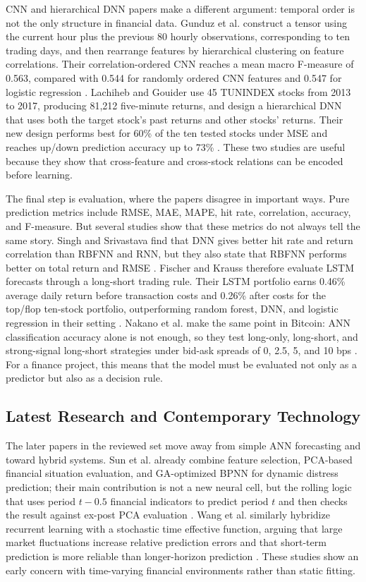 \documentclass[conference]{IEEEtran}
\begin{document}
CNN and hierarchical DNN papers make a different argument: temporal order is not the only structure in financial data. Gunduz et al. construct a tensor using the current hour plus the previous 80 hourly observations, corresponding to ten trading days, and then rearrange features by hierarchical clustering on feature correlations. Their correlation-ordered CNN reaches a mean macro F-measure of 0.563, compared with 0.544 for randomly ordered CNN features and 0.547 for logistic regression \cite{gunduz2017intraday}. Lachiheb and Gouider use 45 TUNINDEX stocks from 2013 to 2017, producing 81,212 five-minute returns, and design a hierarchical DNN that uses both the target stock's past returns and other stocks' returns. Their new design performs best for 60\% of the ten tested stocks under MSE and reaches up/down prediction accuracy up to 73\% \cite{lachiheb2018hierarchical}. These two studies are useful because they show that cross-feature and cross-stock relations can be encoded before learning.

The final step is evaluation, where the papers disagree in important ways. Pure prediction metrics include RMSE, MAE, MAPE, hit rate, correlation, accuracy, and F-measure. But several studies show that these metrics do not always tell the same story. Singh and Srivastava find that DNN gives better hit rate and return correlation than RBFNN and RNN, but they also state that RBFNN performs better on total return and RMSE \cite{singh2017stock}. Fischer and Krauss therefore evaluate LSTM forecasts through a long-short trading rule. Their LSTM portfolio earns 0.46\% average daily return before transaction costs and 0.26\% after costs for the top/flop ten-stock portfolio, outperforming random forest, DNN, and logistic regression in their setting \cite{fischer2018deep}. Nakano et al. make the same point in Bitcoin: ANN classification accuracy alone is not enough, so they test long-only, long-short, and strong-signal long-short strategies under bid-ask spreads of 0, 2.5, 5, and 10 bps \cite{nakano2018bitcoin}. For a finance project, this means that the model must be evaluated not only as a predictor but also as a decision rule.

\subsection{Latest Research and Contemporary Technology}
The later papers in the reviewed set move away from simple ANN forecasting and toward hybrid systems. Sun et al. already combine feature selection, PCA-based financial situation evaluation, and GA-optimized BPNN for dynamic distress prediction; their main contribution is not a new neural cell, but the rolling logic that uses period $t-0.5$ financial indicators to predict period $t$ and then checks the result against ex-post PCA evaluation \cite{sun2011sffs}. Wang et al. similarly hybridize recurrent learning with a stochastic time effective function, arguing that large market fluctuations increase relative prediction errors and that short-term prediction is more reliable than longer-horizon prediction \cite{wang2016elman}. These studies show an early concern with time-varying financial environments rather than static fitting.
\end{document}
